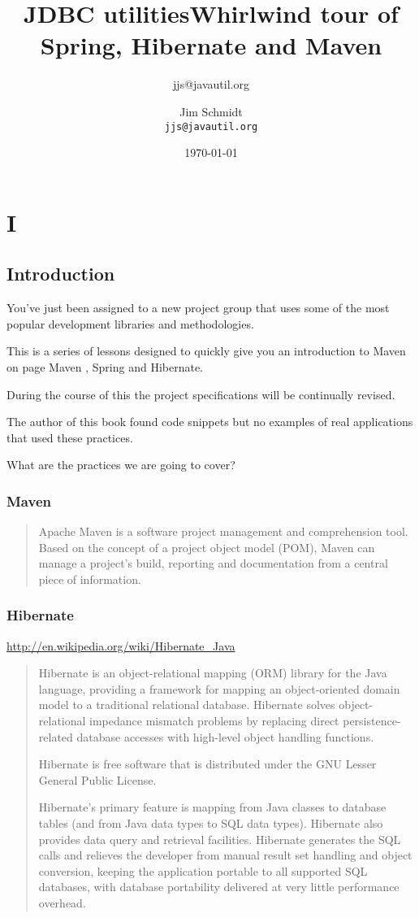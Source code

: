 \documentclass[a4paper,10pt]{book}
\title{JDBC utilities}
\author{jjs@javautil.org}
\begin{document}
\title{Whirlwind tour of Spring, Hibernate and Maven}
\author{Jim Schmidt\\
  \texttt{jjs@javautil.org}}
\date{\today}
\maketitle
\tableofcontents
\part{I}
\chapter{Introduction}
You've just been assigned to a new project group that uses some of the most popular development libraries and 
methodologies.

This is a series of lessons designed to quickly give you an introduction to Maven on page Maven , Spring and Hibernate.

During the course of this the project specifications will be continually revised.

The author of this book found code snippets but no examples of real applications that used these practices.

What are the practices we are going to cover?
\label{Maven}
\section{Maven}

\begin{quotation}
Apache Maven is a software project management and comprehension tool. 
Based on the concept of a project object model (POM), Maven can manage a project's build, 
reporting and documentation from a central piece of information.
\end{quotation}
\section{Hibernate}
\url{http://en.wikipedia.org/wiki/Hibernate_Java}
\begin{quotation}
Hibernate is an object-relational mapping (ORM) library for the Java language, 
providing a framework for mapping an object-oriented domain model to a traditional relational database. Hibernate solves object-relational impedance mismatch problems by replacing direct persistence-related database accesses with high-level object handling functions.

Hibernate is free software that is distributed under the GNU Lesser General Public License.

Hibernate's primary feature is mapping from Java classes to database tables (and from Java data types to SQL data types). 
Hibernate also provides data query and retrieval facilities. 
Hibernate generates the SQL calls and relieves the developer from manual result set handling and object conversion, 
keeping the application portable to all supported SQL databases, with database portability delivered at very little performance overhead. 
\end{quotation}
\end{document}
